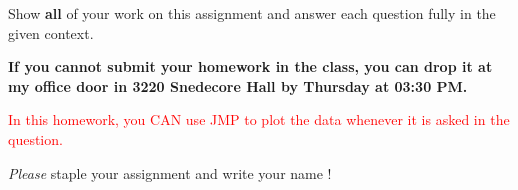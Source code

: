 \documentclass[11pt]{article}\usepackage[]{graphicx}\usepackage[]{color}
\begin{document}

\pagestyle{fancy} 

Show \textbf{all} of your work on this assignment and answer each question fully in the given context. 

\vspace{0.3cm}

\textbf{If you cannot submit your homework in the class, you can drop it at my office door in 3220 Snedecore Hall by Thursday at 03:30 PM.}

\vspace{0.3cm}

\textcolor{red}{In this homework, you CAN use JMP to plot the data whenever it is asked in the question.}
\vspace{0.3cm}

\emph{Please} staple your assignment and write your name !
\end{document}
